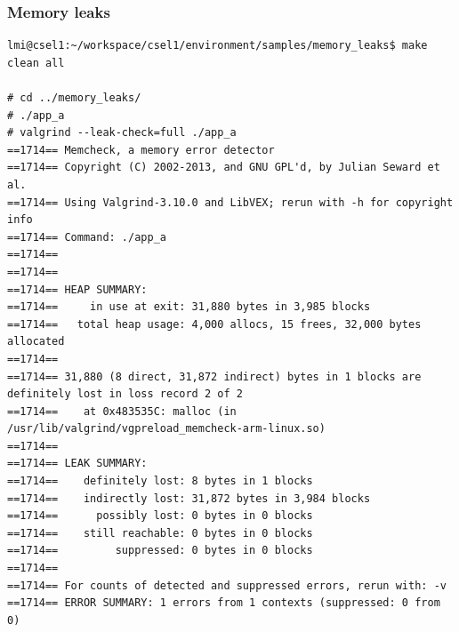 \subsubsection{Memory leaks}
\begin{lstlisting}
lmi@csel1:~/workspace/csel1/environment/samples/memory_leaks$ make clean all

# cd ../memory_leaks/
# ./app_a 
# valgrind --leak-check=full ./app_a
==1714== Memcheck, a memory error detector
==1714== Copyright (C) 2002-2013, and GNU GPL'd, by Julian Seward et al.
==1714== Using Valgrind-3.10.0 and LibVEX; rerun with -h for copyright info
==1714== Command: ./app_a
==1714== 
==1714== 
==1714== HEAP SUMMARY:
==1714==     in use at exit: 31,880 bytes in 3,985 blocks
==1714==   total heap usage: 4,000 allocs, 15 frees, 32,000 bytes allocated
==1714== 
==1714== 31,880 (8 direct, 31,872 indirect) bytes in 1 blocks are definitely lost in loss record 2 of 2
==1714==    at 0x483535C: malloc (in /usr/lib/valgrind/vgpreload_memcheck-arm-linux.so)
==1714== 
==1714== LEAK SUMMARY:
==1714==    definitely lost: 8 bytes in 1 blocks
==1714==    indirectly lost: 31,872 bytes in 3,984 blocks
==1714==      possibly lost: 0 bytes in 0 blocks
==1714==    still reachable: 0 bytes in 0 blocks
==1714==         suppressed: 0 bytes in 0 blocks
==1714== 
==1714== For counts of detected and suppressed errors, rerun with: -v
==1714== ERROR SUMMARY: 1 errors from 1 contexts (suppressed: 0 from 0)
\end{lstlisting}

